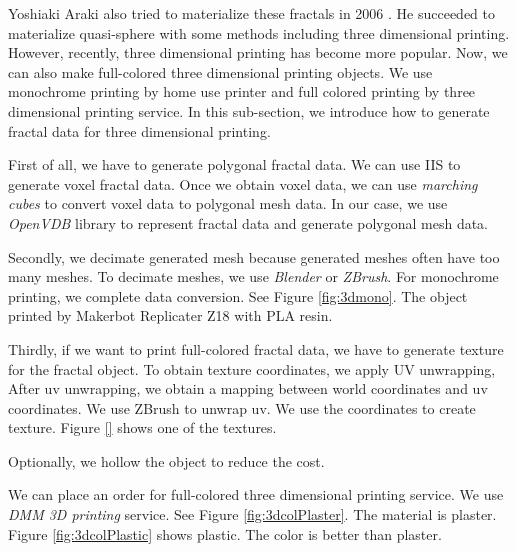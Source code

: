 Yoshiaki Araki also tried to materialize these fractals in 2006
\cite{araki2006materializing}.
He succeeded to materialize quasi-sphere with some methods including
three dimensional printing.
However, recently, three dimensional printing has become more popular.
Now, we can also make full-colored three dimensional printing objects.
We use monochrome printing by home use printer and full colored
printing by three dimensional printing service.
In this sub-section, we introduce how to generate fractal data for three
dimensional printing.

First of all, we have to generate polygonal fractal data.
We can use IIS to generate voxel fractal data.
Once we obtain voxel data, we can use \textit{marching cubes}
to convert voxel data to polygonal mesh data.
In our case, we use \textit{OpenVDB} library to represent fractal data
and generate polygonal mesh data.

Secondly, we decimate generated mesh because generated meshes often have
too many meshes. 
To decimate meshes, we use \textit{Blender} or \textit{ZBrush}.
For monochrome printing, we complete data conversion.
See Figure \ref{fig:3dmono}.
The object printed by Makerbot Replicater Z18 with PLA resin.

Thirdly, if we want to print full-colored fractal data, we have to generate
texture for the fractal object.
To obtain texture coordinates, we apply UV unwrapping,
After uv unwrapping, we obtain a mapping between world coordinates
and uv coordinates.
We use ZBrush to unwrap uv.
We use the coordinates to create texture. Figure \ref{} shows one of the textures.

Optionally, we hollow the object to reduce the cost.

We can place an order for full-colored three dimensional printing service.
We use \textit{DMM 3D printing} service.
See Figure \ref{fig:3dcolPlaster}. The material is plaster.
Figure \ref{fig:3dcolPlastic} shows plastic.
The color is better than plaster.
